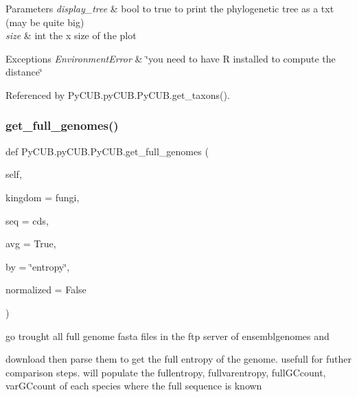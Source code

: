 \begin{DoxyParams}{Parameters}
{\em display\+\_\+tree} & bool to true to print the phylogenetic tree as a txt (may be quite big) \\
\hline
{\em size} & int the x size of the plot\\
\hline
\end{DoxyParams}

\begin{DoxyExceptions}{Exceptions}
{\em Environment\+Error} & \char`\"{}you need to have R installed to compute the distance\char`\"{} \\
\hline
\end{DoxyExceptions}


Referenced by Py\+C\+U\+B.\+py\+C\+U\+B.\+Py\+C\+U\+B.\+get\+\_\+taxons().

\mbox{\label{class_py_c_u_b_1_1py_c_u_b_1_1_py_c_u_b_a53b60adfafbe019421d010c5fed04f5c}} 
\subsubsection{\texorpdfstring{get\+\_\+full\+\_\+genomes()}{get\_full\_genomes()}}
{\footnotesize\ttfamily def Py\+C\+U\+B.\+py\+C\+U\+B.\+Py\+C\+U\+B.\+get\+\_\+full\+\_\+genomes (\begin{DoxyParamCaption}\item[{}]{self,  }\item[{}]{kingdom = {\ttfamily \textquotesingle{}fungi\textquotesingle{}},  }\item[{}]{seq = {\ttfamily \textquotesingle{}cds\textquotesingle{}},  }\item[{}]{avg = {\ttfamily True},  }\item[{}]{by = {\ttfamily \char`\"{}entropy\char`\"{}},  }\item[{}]{normalized = {\ttfamily False} }\end{DoxyParamCaption})}



go trought all full genome fasta files in the ftp server of ensemblgenomes and 

download then parse them to get the full entropy of the genome. usefull for futher comparison steps. will populate the fullentropy, fullvarentropy, full\+G\+Ccount, var\+G\+Ccount of each species where the full sequence is known


